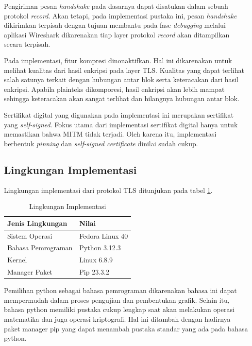 Pengiriman pesan \emph{handshake} pada dasarnya dapat disatukan dalam sebuah protokol \emph{record}. Akan tetapi, pada implementasi pustaka ini, pesan \emph{handshake} dikirimkan terpisah dengan tujuan  membantu pada fase \emph{debugging} melalui aplikasi Wireshark dikarenakan tiap layer protokol \emph{record} akan ditampilkan secara terpisah.

Pada implementasi, fitur kompresi dinonaktifkan. Hal ini dikarenakan untuk melihat kualitas dari hasil enkripsi pada layer TLS. Kualitas yang dapat terlihat salah satunya terkait dengan hubungan antar blok serta keteracakan dari hasil enkripsi. Apabila plainteks dikomporesi, hasil enkripsi akan lebih mampat sehingga keteracakan akan sangat terlihat dan hilangnya hubungan antar blok.

Sertifikat digital yang digunakan pada implementasi ini merupakan sertifikat yang \emph{self-signed}. Fokus utama dari implementasi sertifikat digital hanya untuk memastikan bahwa MITM tidak terjadi. Oleh karena itu, implementasi berbentuk \emph{pinning} dan \emph{self-signed certificate} dinilai sudah cukup.

\subsection{Lingkungan Implementasi}

Lingkungan implementasi dari protokol TLS ditunjukan pada tabel \ref{tab:impl.env}.

\begin{table}[!h]
  \centering
  \caption{Lingkungan Implementasi} \label{tab:impl.env}
  \begin{tabular}{|p{3cm}|p{6cm}|}
    \hline
    \textbf{Jenis Lingkungan} & \textbf{Nilai} \\ \hline
    Sistem Operasi & Fedora Linux 40 \\ \hline
    Bahasa Pemrograman & Python 3.12.3 \\ \hline
    Kernel & Linux 6.8.9 \\ \hline
    Manager Paket & Pip 23.3.2 \\ \hline
  \end{tabular}
\end{table}

Pemilihan python sebagai bahasa pemrograman dikarenakan bahasa ini dapat mempermudah dalam proses pengujian dan pembentukan grafik. Selain itu, bahasa python memiliki pustaka cukup lengkap saat akan melakukan operasi matematika dan juga operasi kriptografi. Hal ini ditambah dengan hadirnya paket manager pip yang dapat menambah pustaka standar yang ada pada bahasa python.

